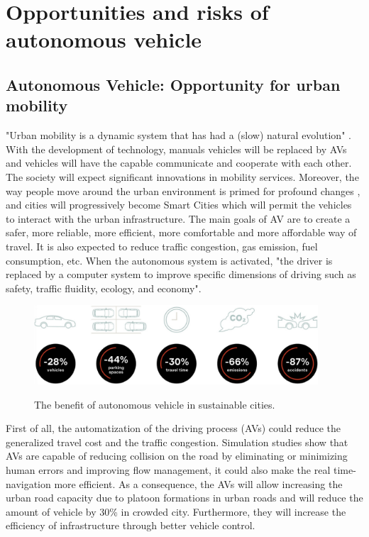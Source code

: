 \section{Opportunities and risks of autonomous vehicle}


\subsection{Autonomous Vehicle: Opportunity for urban mobility}
"Urban mobility is a dynamic system that has had a (slow) natural evolution" \cite{medina-tapia_exploring_2018}. With the development of technology, manuals vehicles will be replaced by AVs and vehicles will have the capable communicate and cooperate with each other. The society will expect significant innovations in mobility services. Moreover, the way people move around the urban environment is primed for profound changes , and cities will progressively become Smart Cities which will permit the vehicles to interact with the urban infrastructure.
The main goals of AV are to create a safer, more reliable, more efficient, more comfortable and more affordable way of travel. It is also expected to reduce traffic congestion, gas emission, fuel consumption, etc. When the autonomous system is activated, "the driver is replaced by a computer system to improve specific dimensions of driving such as safety, traffic fluidity, ecology, and economy".\cite{chehri_autonomous_2019} \smallskip

\begin{center}
    \begin{figure}[ht!]
        \centering
        \includegraphics[width=400px, keepaspectratio]{imports/benefi_of_AVs..jpg}
        \caption{The benefit of autonomous vehicle in sustainable cities.}  \cite{chehri_autonomous_2019}
    \end{figure}
\end{center}

First of all, the automatization of the driving process (AVs) could reduce the generalized travel cost and the traffic congestion. Simulation studies show that AVs are capable of reducing collision on the road by eliminating or minimizing human errors and improving flow management, it could also make the real time-navigation more efficient. As a consequence, the AVs will allow increasing the urban road capacity due to platoon formations in urban roads and will reduce the amount of vehicle by 30\% in crowded city. Furthermore, they will increase the efficiency of infrastructure through better vehicle control. \smallskip


